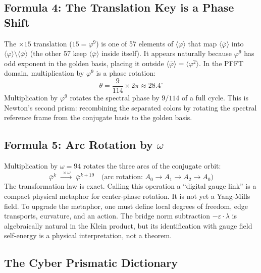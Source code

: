 \documentclass[12pt,oneside]{article}
\theoremstyle{principia}
\theoremstyle{definition}
\theoremstyle{remark}
\providecommand{\vp}{\varphi}
\providecommand{\vpbar}{\bar{\varphi}}
\begin{document}
\subsection{Formula 4: The Translation Key is a Phase Shift}

The $\times 15$ translation ($15 = \vp^9$) is one of 57 elements of $\langle \vp \rangle$ that map $\langle \vpbar \rangle$ into $\langle \vp \rangle \setminus \langle \vpbar \rangle$ (the other 57 keep $\langle \vpbar \rangle$ inside itself). It appears naturally because $\vp^9$ has odd exponent in the golden basis, placing it outside $\langle \vpbar \rangle = \langle \vp^2 \rangle$. In the PFFT domain, multiplication by $\vp^9$ is a phase rotation:
\begin{equation}\label{eq:phase_shift}
\theta = \frac{9}{114} \times 2\pi \approx 28.4^\circ
\end{equation}
Multiplication by $\vp^9$ rotates the spectral phase by $9/114$ of a full cycle. This is Newton's second prism: recombining the separated colors by rotating the spectral reference frame from the conjugate basis to the golden basis.

\subsection{Formula 5: Arc Rotation by $\omega$}

Multiplication by $\omega = 94$ rotates the three arcs of the conjugate orbit:
\[
\vpbar^k \;\xrightarrow{\;\times\omega\;}\; \vpbar^{k+19} \quad \text{(arc rotation: } A_0 \to A_1 \to A_2 \to A_0\text{)}
\]
The transformation law is exact. Calling this operation a ``digital gauge link'' is a compact physical metaphor for center-phase rotation. It is not yet a Yang-Mills field. To upgrade the metaphor, one must define local degrees of freedom, edge transports, curvature, and an action. The bridge norm subtraction $-\varepsilon \cdot \lambda$ is algebraically natural in the Klein product, but its identification with gauge field self-energy is a physical interpretation, not a theorem.

\subsection{The Cyber Prismatic Dictionary}
\end{document}
